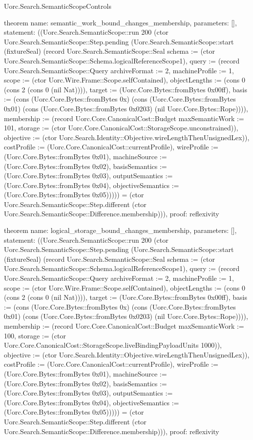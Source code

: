 \begin{lexlean}{Uorc.Search.SemanticScopeControls}
\begin{semanticmodule}
theorem{
  name: semantic_work_bound_changes_membership,
  parameters: [],
  statement: ((Uorc.Search.SemanticScope::run 200 (ctor Uorc.Search.SemanticScope::Step.pending (Uorc.Search.SemanticScope::start (fixtureSeal) (record Uorc.Search.SemanticScope::Seal {schema := (ctor Uorc.Search.SemanticScope::Schema.logicalReferenceScope1), query := (record Uorc.Search.SemanticScope::Query {archiveFormat := 2, machineProfile := 1, scope := (ctor Uorc.Wire.Frame::Scope.selfContained), objectLengths := (cons 0 (cons 2 (cons 0 (nil Nat)))), target := (Uorc.Core.Bytes::fromBytes 0x00ff), basis := (cons (Uorc.Core.Bytes::fromBytes 0x) (cons (Uorc.Core.Bytes::fromBytes 0x01) (cons (Uorc.Core.Bytes::fromBytes 0x0203) (nil Uorc.Core.Bytes::Rope)))), membership := (record Uorc.Core.CanonicalCost::Budget {maxSemanticWork := 101, storage := (ctor Uorc.Core.CanonicalCost::StorageScope.unconstrained)}), objective := (ctor Uorc.Search.Identity::Objective.wireLengthThenUnsignedLex)}), costProfile := (Uorc.Core.CanonicalCost::currentProfile), wireProfile := (Uorc.Core.Bytes::fromBytes 0x01), machineSource := (Uorc.Core.Bytes::fromBytes 0x02), basisSemantics := (Uorc.Core.Bytes::fromBytes 0x03), outputSemantics := (Uorc.Core.Bytes::fromBytes 0x04), objectiveSemantics := (Uorc.Core.Bytes::fromBytes 0x05)})))) = (ctor Uorc.Search.SemanticScope::Step.different (ctor Uorc.Search.SemanticScope::Difference.membership))),
  proof: reflexivity{}
}

theorem{
  name: logical_storage_bound_changes_membership,
  parameters: [],
  statement: ((Uorc.Search.SemanticScope::run 200 (ctor Uorc.Search.SemanticScope::Step.pending (Uorc.Search.SemanticScope::start (fixtureSeal) (record Uorc.Search.SemanticScope::Seal {schema := (ctor Uorc.Search.SemanticScope::Schema.logicalReferenceScope1), query := (record Uorc.Search.SemanticScope::Query {archiveFormat := 2, machineProfile := 1, scope := (ctor Uorc.Wire.Frame::Scope.selfContained), objectLengths := (cons 0 (cons 2 (cons 0 (nil Nat)))), target := (Uorc.Core.Bytes::fromBytes 0x00ff), basis := (cons (Uorc.Core.Bytes::fromBytes 0x) (cons (Uorc.Core.Bytes::fromBytes 0x01) (cons (Uorc.Core.Bytes::fromBytes 0x0203) (nil Uorc.Core.Bytes::Rope)))), membership := (record Uorc.Core.CanonicalCost::Budget {maxSemanticWork := 100, storage := (ctor Uorc.Core.CanonicalCost::StorageScope.liveBindingPayloadUnits 1000)}), objective := (ctor Uorc.Search.Identity::Objective.wireLengthThenUnsignedLex)}), costProfile := (Uorc.Core.CanonicalCost::currentProfile), wireProfile := (Uorc.Core.Bytes::fromBytes 0x01), machineSource := (Uorc.Core.Bytes::fromBytes 0x02), basisSemantics := (Uorc.Core.Bytes::fromBytes 0x03), outputSemantics := (Uorc.Core.Bytes::fromBytes 0x04), objectiveSemantics := (Uorc.Core.Bytes::fromBytes 0x05)})))) = (ctor Uorc.Search.SemanticScope::Step.different (ctor Uorc.Search.SemanticScope::Difference.membership))),
  proof: reflexivity{}
}


\end{semanticmodule}
\end{lexlean}
